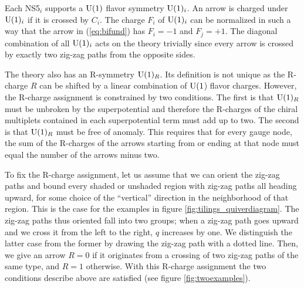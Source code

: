 Each NS5$_{i}$ supports a $\mathrm{U}(1)$ flavor symmetry $\mathrm{U}(1)_{i}$. An
arrow is charged under $\mathrm{U}(1)_{i}$ if it is crossed by $C_{i}$. The
charge $F_{i}$ of $\mathrm{U}(1)_{i}$ can be normalized in such a way that
the arrow in (\ref{eq:bifund}) has $F_{i}=-1$ and $F_{j}=+1$. The
diagonal combination of all $\mathrm{U}(1)_{i}$ acts on the theory trivially
since every arrow is crossed by exactly two zig-zag paths from the
opposite sides. 

The theory also has an R-symmetry $\mathrm{U}(1)_{R}$. Its definition is not
unique as the R-charge $R$ can be shifted by a linear combination
of $\mathrm{U}(1$) flavor charges. However, the R-charge assignment is constrained
by two conditions. The first is that $\mathrm{U}(1)_{R}$ must be unbroken
by the superpotential and therefore the R-charges of the chiral multiplets
contained in each superpotential term must add up to two. The second
is that $\mathrm{U}(1)_{R}$ must be free of anomaly. This requires that for
every gauge node, the sum of the R-charges of the arrows starting
from or ending at that node must equal the number of the arrows minus
two. 

To fix the R-charge assignment, let us assume that we can orient the
zig-zag paths and bound every shaded or unshaded region with zig-zag
paths all heading upward, for some choice of the ``vertical'' direction
in the neighborhood of that region. This is the case for the examples
in figure \ref{fig:tilings_quiverdiagram}. The zig-zag paths thus oriented fall into two groups; when
a zig-zag path goes upward and we cross it from the left to the right,
$q$ increases by one. We distinguish the latter case from the former
by drawing the zig-zag path with a dotted line. Then, we give an arrow
$R=0$ if it originates from a crossing of two zig-zag paths of the
same type, and $R=1$ otherwise. With this R-charge assignment the
two conditions describe above are satisfied (see figure \ref{fig:twoexamples}). 


